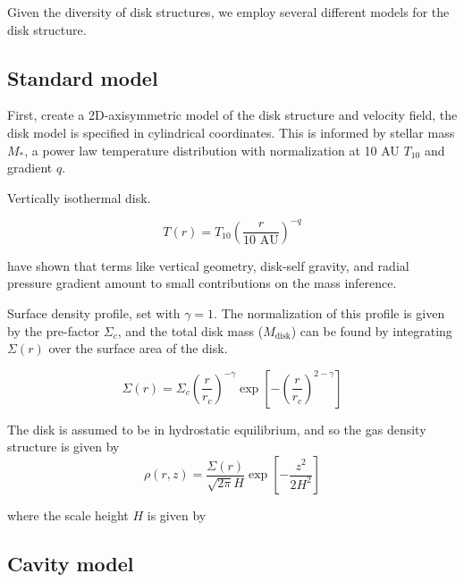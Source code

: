 \documentclass{aastex6}
\begin{document}



Given the diversity of disk structures, we employ several different models for the disk structure.

\subsection{Standard model}


First, create a 2D-axisymmetric model of the disk structure and velocity field, the disk model is specified in cylindrical coordinates. This is informed by stellar mass $M_\ast$, a power law temperature distribution with normalization at 10 AU $T_{10}$ and gradient $q$.

Vertically isothermal disk.

\begin{equation}
	T(r) = T_{10} \left ( \frac{r}{\textrm{10 AU}}\right)^{-q}
\end{equation}

\citet{rosenfeld13a} have shown that terms like vertical geometry, disk-self gravity, and radial pressure gradient amount to small contributions on the mass inference.

Surface density profile, set with $\gamma = 1$. The normalization of this profile is given by the pre-factor $\Sigma_c$, and the total disk mass ($M_\textrm{disk}$) can be found by integrating $\Sigma(r)$ over the surface area of the disk.

\begin{equation}
\Sigma(r) = \Sigma_c \left (\frac{r}{r_c} \right)^{- \gamma} \exp \left[ - \left(\frac{r}{r_c} \right)^{2 - \gamma} \right]
\end{equation}

The disk is assumed to be in hydrostatic equilibrium, and so the gas density structure is given by
\begin{equation}
\rho(r, z) = \frac{\Sigma(r)}{\sqrt{2 \pi} H} \exp \left [- \frac{z^2}{2 H^2} \right]
\end{equation}

where the scale height $H$ is given by

\subsection{Cavity model}
\end{document}
